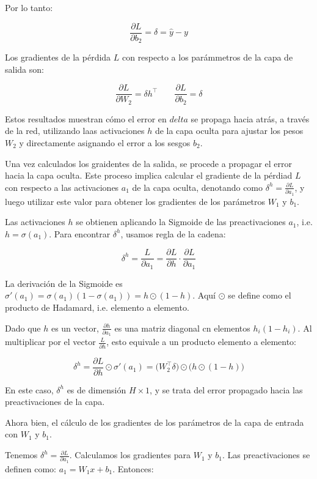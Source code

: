 Por lo tanto:

\[
    \frac{\partial L}{\partial b_{2}} = \delta = \hat{y} - y
\]

Los gradientes de la pérdida $L$ con respecto a los parámmetros de la capa de salida son:

\[
    \boxed{\frac{\partial L}{\partial W_{2}} = \delta h^\top \;\;\;\;\;\;\; \frac{\partial L}{\partial b_{2}} = \delta}
\]

Estos resultados muestran cómo el error en $delta$ se propaga hacia atrás, a través de la red, utilizando
laas activaciones $h$ de la capa oculta para ajustar los pesos $W_2$ y directamente asignando el error a los 
sesgos $b_2$. 

Una vez calculados los graidentes de la salida, se procede a propagar el error hacia la capa oculta. 
Este proceso implica calcular el gradiente de la pérdiad $L$ con respecto a las activaciones $a_1$
de la capa oculta, denotando como $\delta^h = \frac{\partial L}{\partial a_1}$, y luego utilizar este
valor para obtener los gradientes de los parámetros $W_1$ y $b_1$. 

Las activaciones $h$ se obtienen aplicando la Sigmoide de las preactivaciones $a_1$, i.e. $h = \sigma(a_1)$.
Para encontrar $\delta^h$, usamos regla de la cadena:

\[
    \delta^h = \frac{L}{\partial a_1} = \frac{\partial L}{\partial h} \cdot \frac{\partial L}{\partial a_1}
\]

La derivación de la Sigmoide es $\sigma'(a_1) = \sigma(a_1)(1 - \sigma(a_1)) = h \odot (1 - h)$. Aquí
$\odot$ se define como el producto de Hadamard, i.e. elemento a elemento. 

Dado que $h$ es un vector, $\frac{\partial h}{\partial a_1}$ es una matriz diagonal cn elementos $h_i(1 - h_i)$.
Al multiplicar por el vector $\frac{L}{\partial h}$, esto equivale a un producto elemento a elemento:

\[
    \delta^h = \frac{\partial L}{\partial h} \odot \sigma'(a_1) = \big(W_2^\top \delta\big) \odot \big(h \odot (1- h)\big)
\]

En este caso, $\delta^h$ es de dimensión $H \times 1$, y se trata del error propagado hacia las preactivaciones
de la capa. 

Ahora bien, el cálculo de los gradientes de los parámetros de la capa de entrada con $W_1$ y $b_1$. 

Tenemos $\delta^h = \frac{\partial L}{\partial a_1}$. Calculamos los gradientes para $W_1$ y $b_1$. Las preactivaciones
se definen como: $a_1 = W_1 x + b_1$. Entonces:

